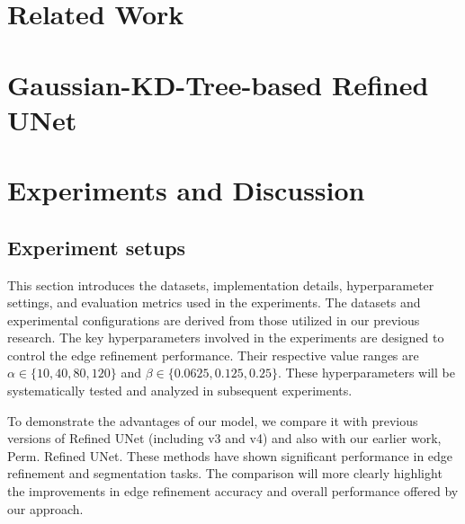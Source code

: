 \documentclass[journal]{IEEEtran}
\begin{document}



\section{Related Work}
\label{sec:relatedwork}

\section{Gaussian-KD-Tree-based Refined UNet}
\label{sec:method}

\section{Experiments and Discussion}
\label{sec:experiment}

\subsection{Experiment setups}
\label{subsec:experimentsetup}
This section introduces the datasets, implementation details, hyperparameter settings, and evaluation metrics used in the experiments. The datasets and experimental configurations are derived from those utilized in our previous research. The key hyperparameters involved in the experiments are designed to control the edge refinement performance. Their respective value ranges are $\alpha \in \{10,40,80,120\}$ and $\beta \in \{0.0625,0.125,0.25\}$. These hyperparameters will be systematically tested and analyzed in subsequent experiments.

To demonstrate the advantages of our model, we compare it with previous versions of Refined UNet (including v3 and v4) and also with our earlier work, Perm. Refined UNet. These methods have shown significant performance in edge refinement and segmentation tasks. The comparison will more clearly highlight the improvements in edge refinement accuracy and overall performance offered by our approach.
\end{document}
